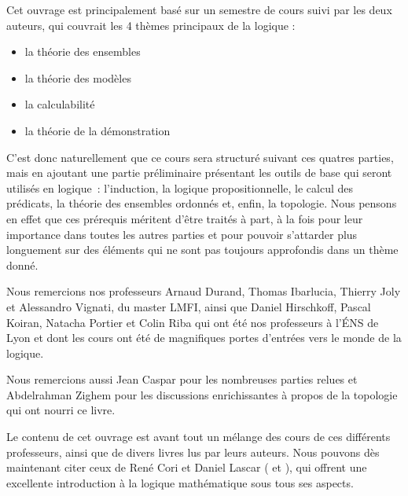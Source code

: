 Cet ouvrage est principalement basé sur un semestre de cours suivi par les deux
auteurs, qui couvrait les 4 thèmes principaux de la logique :
\begin{itemize}
\item la théorie des ensembles
\item la théorie des modèles
\item la calculabilité
\item la théorie de la démonstration
\end{itemize}

C'est donc naturellement que ce cours sera structuré suivant ces quatres
parties, mais en ajoutant une partie préliminaire présentant les outils de base
qui seront utilisés en logique~: l'induction, la logique propositionnelle, le
calcul des prédicats, la théorie des ensembles ordonnés et, enfin, la topologie.
Nous pensons en effet que ces prérequis méritent d'être traités à part, à la
fois pour leur importance dans toutes les autres parties et pour pouvoir
s'attarder plus longuement sur des éléments qui ne sont pas toujours approfondis
dans un thème donné.

Nous remercions nos professeurs Arnaud Durand, Thomas Ibarlucia, Thierry Joly et
Alessandro Vignati, du master LMFI, ainsi que Daniel Hirschkoff, Pascal Koiran,
Natacha Portier et Colin Riba qui ont été nos professeurs à l'\'ENS de Lyon et
dont les cours ont été de magnifiques portes d'entrées vers le monde de la
logique.

Nous remercions aussi Jean Caspar pour les nombreuses parties relues et
Abdelrahman Zighem pour les discussions enrichissantes à propos de la topologie
qui ont nourri ce livre.

Le contenu de cet ouvrage est avant tout un mélange des cours de ces différents
professeurs, ainsi que de divers livres lus par leurs auteurs. Nous pouvons dès
maintenant citer ceux de René Cori et Daniel Lascar
(\cite{cori2003logique} et \cite{cori1993logique}), qui offrent une excellente
introduction à la logique mathématique sous tous ses aspects.
